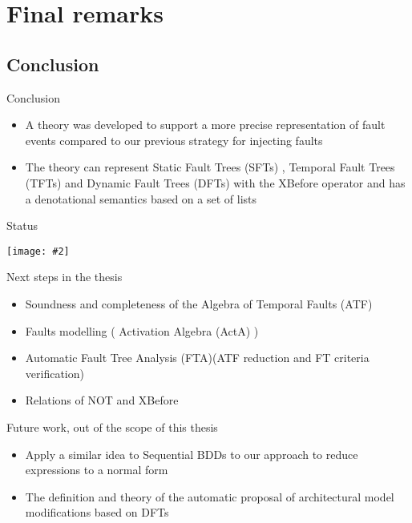 \documentclass{beamer}
\def\FTA{Fault Tree Analysis (FTA)\gdef\FTA{FTA\xspace}\xspace}
\def\SFT{%
	Static Fault Tree (SFT)%
	\gdef\SFT{SFT\xspace}%
	\gdef\SFTs{SFTs\xspace}%
	\xspace%
}
\def\SFTs{%
	Static Fault Trees (SFTs)%
	\gdef\SFT{SFT\xspace}%
	\gdef\SFTs{SFTs\xspace}%
	\xspace%
}
\def\TFT{%
	Temporal Fault Tree (TFT)%
	\gdef\TFT{TFT\xspace}%
	\gdef\TFTs{TFTs\xspace}%
	\xspace%
}
\def\TFTs{%
	Temporal Fault Trees (TFTs)%
	\gdef\TFT{TFT\xspace}%
	\gdef\TFTs{TFTs\xspace}%
	\xspace%
}
\def\DFT{%
	Dynamic Fault Tree (DFT)%
	\gdef\DFT{DFT\xspace}%
	\gdef\DFTs{DFTs\xspace}%
	\xspace%
}
\def\DFTs{%
	Dynamic Fault Trees (DFTs)%
	\gdef\DFT{DFT\xspace}%
	\gdef\DFTs{DFTs\xspace}%
	\xspace%
}
\def\ATF{%
	Algebra of Temporal Faults (ATF)%
	\gdef\ATF{ATF\xspace}%
	\gdef\iATF{an ATF\xspace}%
	\gdef\IATF{An ATF\xspace}%
	\xspace%
}
\def\iATF{%
	an Algebra of Temporal Faults (ATF)%
	\gdef\ATF{ATF\xspace}%
	\gdef\iATF{an ATF\xspace}%
	\gdef\IATF{An ATF\xspace}%
	\xspace%
}
\def\IATF{%
	An Algebra of Temporal Faults (ATF)%
	\gdef\ATF{ATF\xspace}%
	\gdef\iATF{an ATF\xspace}%
	\gdef\IATF{An ATF\xspace}%
	\xspace%
}
\def\activation{%
	Activation Algebra (ActA)%
	\gdef\activation{ActA\xspace}%
	\xspace%
}
\newcommand{\includegraphicsaspectratio}[2][1]{%
  \texttt{[image: \#2]}%
}
\begin{document}
\section{Final remarks}
\subsection{Conclusion}

\begin{frame}{Conclusion}
	\begin{itemize}
		\item A theory was developed to support a more precise representation of fault events compared to our previous strategy for injecting faults
		\item The theory can represent \SFTs, \TFTs and \DFTs with the XBefore operator and has a denotational semantics based on a set of lists
	\end{itemize}
\end{frame}

\begin{frame}{Status}
	\begin{center}
		\includegraphicsaspectratio[0.8]{StrategyOverview-Status}
	\end{center}
\end{frame}

\begin{frame}[label=nextsteps]{Next steps in the thesis}
	\begin{itemize}
		\item Soundness and completeness of the \ATF
		\item Faults modelling (\activation) 
		\item Automatic \FTA (\ATF reduction and FT criteria verification)
		\item Relations of NOT and XBefore
	\end{itemize}
	\hyperlink{tasks}{}
\end{frame}

\begin{frame}{Future work, out of the scope of this thesis}
	\begin{itemize}
		\item Apply a similar idea to Sequential BDDs to our approach to reduce expressions to a normal form
		\item The definition and theory of the automatic proposal of architectural model modifications based on \DFTs
	\end{itemize}
\end{frame}
\end{document}
